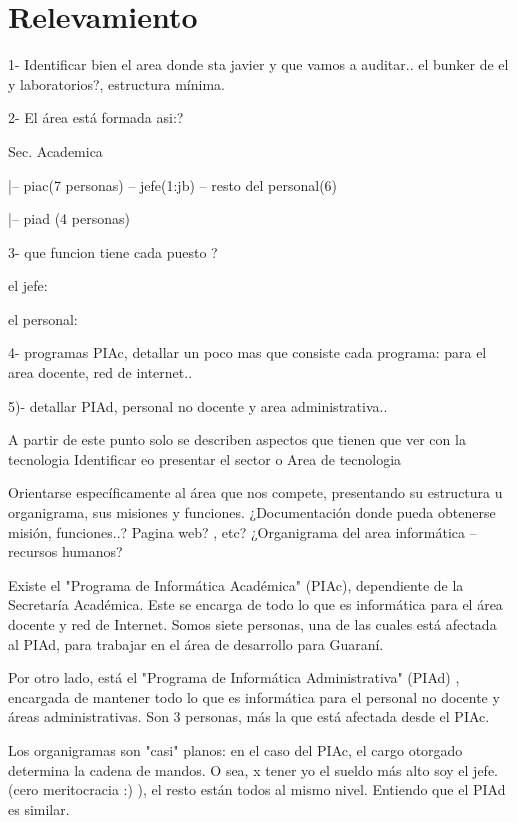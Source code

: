 \documentclass[10pt,a4paper,final]{article}
\begin{document}
\section{Relevamiento}

1- Identificar bien el area donde sta javier y que vamos a auditar.. 
 el bunker de el y laboratorios?, estructura mínima.

2- El área está formada asi:? 

  Sec. Academica 

   |-- piac(7 personas) -- jefe(1:jb) -- resto del personal(6)

   |-- piad (4 personas) 

3- que funcion tiene cada puesto ?

   el jefe:

   el personal:
   
4- programas PIAc, detallar un poco mas que consiste cada programa: para el 
area docente, red de internet..

5)- detallar PIAd, personal no docente y area administrativa..

\begin{scriptsize}
A partir de este punto solo se describen aspectos que tienen que ver con la tecnologia
Identificar eo presentar el sector o Area de tecnologia

Orientarse específicamente al área que nos compete, presentando su estructura u organigrama, sus misiones y funciones.
¿Documentación donde pueda obtenerse misión, funciones..? Pagina web? , etc?
¿Organigrama del area informática – recursos humanos?

Existe el "Programa de Informática Académica" (PIAc), dependiente de la Secretaría Académica. Este se encarga de todo lo que es informática para el área docente y red de Internet. Somos siete personas, una de las cuales está afectada al PIAd, para trabajar en el área de desarrollo para Guaraní.

Por otro lado, está el "Programa de Informática Administrativa" (PIAd) , encargada de mantener todo lo que es informática para el personal no docente y áreas administrativas. Son 3 personas, más la que está afectada desde el PIAc.

Los organigramas son "casi" planos: en el caso del PIAc, el cargo otorgado determina la cadena de mandos. O sea, x tener yo el sueldo más alto soy el jefe.  (cero meritocracia :) ), el resto están todos al mismo nivel. Entiendo que el PIAd es similar.
\end{scriptsize}
\end{document}
